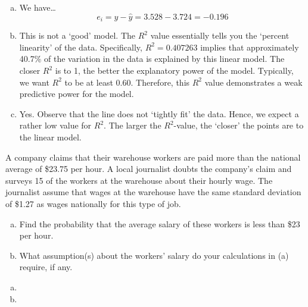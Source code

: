 \documentclass[12pt,letterpaper]{exam}
\begin{document}
\begin{questions}
{\begin{enumerate}[(a)]
\item We have\dots
	\[
	e_i= y - \widehat{y}= 3.528 - 3.724= -0.196
	\]

\item This is not a `good' model. The $R^2$ value essentially tells you the `percent linearity' of the data. Specifically, $R^2= 0.407263$ implies that approximately 40.7\% of the variation in the data is explained by this linear model. The closer $R^2$ is to 1, the better the explanatory power of the model. Typically, we want $R^2$ to be at least 0.60. Therefore, this $R^2$ value demonstrates a weak predictive power for the model. \pspace

\item Yes. Observe that the line does not `tightly fit' the data. Hence, we expect a rather low value for $R^2$. The larger the $R^2$-value, the `closer' the points are to the linear model. 
\end{enumerate}
}



\newpage
\question[10] A company claims that their warehouse workers are paid more than the national average of \$23.75 per hour. A local journalist doubts the company's claim and surveys 15 of the workers at the warehouse about their hourly wage. The journalist assume that wages at the warehouse have the same standard deviation of \$1.27 as wages nationally for this type of job.
	\begin{enumerate}[(a)]
	\item Find the probability that the average salary of these workers is less than \$23 per hour.
	\item What assumption(s) about the workers' salary do your calculations in (a) require, if any. 
	\end{enumerate} \pspace

\sol 
{\itshape
\begin{enumerate}[(a)]
\item 
\item 
\end{enumerate}
}




\end{questions}
\end{document}
